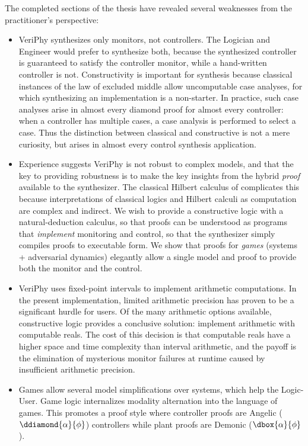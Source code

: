 \documentclass[12pt]{cmuthesis}
\theoremstyle{definition}
\theoremstyle{remark}
\newcommand{\VeriPhy}{VeriPhy\xspace}
\begin{document}
The completed sections of the thesis have revealed several weaknesses from the practitioner's perspective:
\begin{itemize}
\item
\VeriPhy synthesizes only monitors, not controllers.
The Logician and Engineer would prefer to synthesize both, because the synthesized controller is guaranteed to satisfy the controller monitor, while a hand-written controller is not.
Constructivity is important for synthesis because classical instances of the law of excluded middle allow uncomputable case analyses, for which synthesizing an implementation is a non-starter.
In practice, such case analyses arise in almost every diamond proof for almost every controller: when a controller has multiple cases, a case analysis is performed to select a case.
Thus the distinction between classical and constructive is not a mere curiosity, but arises in almost every control synthesis application.
\item
Experience suggests \VeriPhy is not robust to complex models, and that the key to providing robustness is to make the key insights from the hybrid \emph{proof} available to the synthesizer.
The classical Hilbert calculus of \dL complicates this because interpretations of classical logics and Hilbert calculi as computation are complex and indirect.
We wish to provide a constructive logic with a natural-deduction calculus, so that proofs can be understood as programs that \emph{implement} monitoring and control, so that the synthesizer simply compiles proofs to executable form.
We show that proofs for \emph{games} (systems + adversarial dynamics) elegantly allow a single model and proof to provide both the monitor and the control.
\item
\VeriPhy uses fixed-point intervals to implement arithmetic computations.
In the present implementation, limited arithmetic precision has proven to be a significant hurdle for users.
Of the many arithmetic options available, constructive logic provides a conclusive solution: implement arithmetic with computable reals.
The cost of this decision is that computable reals have a higher space and time complexity than interval arithmetic, and the payoff is the elimination of mysterious monitor failures at runtime caused by insufficient arithmetic precision.
\item
Games allow several model simplifications over systems, which help the Logic-User.
Game logic internalizes modality alternation into the language of games.
This promotes a proof style where controller proofs are Angelic ($\ddiamond{\alpha}{\phi}$) controllers while plant proofs are Demonic ($\dbox{\alpha}{\phi}$).

\end{itemize}
\end{document}
